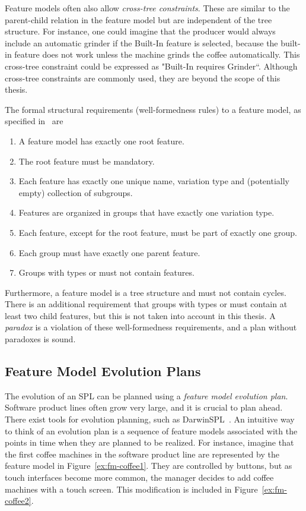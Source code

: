 Feature models often also allow \emph{cross-tree constraints}. These are similar to the parent-child relation in the feature model but are independent of the tree structure. For instance, one could imagine that the producer would always include an automatic grinder if the Built-In feature is selected, because the built-in feature does not work unless the machine grinds the coffee automatically. This cross-tree constraint could be expressed as "Built-In requires Grinder``. Although cross-tree constraints are commonly used, they are beyond the scope of this thesis.

The formal structural requirements (well-formedness rules) to a feature model, as specified in~\cite{art:consistency-preserving-evolution-planning} are 
\begin{enumerate}[\itbf{WF\arabic*}, itemsep=0mm]
   \label{wf-requirements}
   \item A feature model has exactly one root feature.
   \item The root feature must be mandatory.
   \item Each feature has exactly one unique name, variation type and (potentially empty) collection of subgroups.
   \item Features are organized in groups that have exactly one variation type.
   \item Each feature, except for the root feature, must be part of exactly one group.
   \item Each group must have exactly one parent feature.
   \item Groups with types \xortype{} or \ortype{} must not contain \mandatory{} features.
\end{enumerate}

Furthermore, a feature model is a tree structure and must not contain cycles. There is an additional requirement that groups with types \xortype{} or \ortype{} must contain at least two child features, but this is not taken into account in this thesis. A \emph{paradox} is a violation of these well-formedness requirements, and a plan without paradoxes is sound.

\subsection{Feature Model Evolution Plans}
\label{sub:feature-model-evolution-plans}
The evolution of an SPL can be planned using a \emph{feature model evolution plan}. Software product lines often grow very large, and it is crucial to plan ahead. 
There exist tools for evolution planning, such as DarwinSPL~\cite{art:darwinspl-an-integrated-tool-suite-for-modeling-evolving-context-aware-software-product-lines}. An intuitive way to think of an evolution plan is a sequence of feature models associated with the points in time when they are planned to be realized. For instance, imagine that the first coffee machines in the software product line are represented by the feature model in Figure~\vref{ex:fm-coffee1}. They are controlled by buttons, but as touch interfaces become more common, the manager decides to add coffee machines with a touch screen. This modification is included in Figure~\vref{ex:fm-coffee2}.


